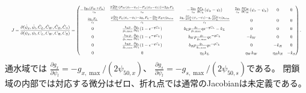 \documentclass[a4paper,11pt]{ltjsarticle}
\begin{document}
\begin{landscape}
\begin{equation}\label{eq:fulljacobian}
\resizebox{\linewidth}{!}{$\displaystyle
J=\frac{\partial(\dot\psi_x,\dot\psi_l,\dot C_L,\dot C_W,\dot C_R,\dot C_S)}
        {\partial(\psi_x,\psi_l,C_L,C_W,C_R,C_S)}
=\begin{pmatrix}
-\frac{2g_x(F_W+F_L)}{c_x}
&\frac{2\frac{\partial g_x}{\partial\psi_l}
 \{F_W(\psi_r-\psi_x)-F_L(\psi_x-\psi_l)\}+2g_xF_L}{c_x}
&-\frac{2g_x}{c_x}\frac{\partial F_L}{\partial C_L}(\psi_x-\psi_l)
&\frac{2g_x}{c_x}\frac{\partial F_W}{\partial C_W}(\psi_r-\psi_x)&0&0\\[6pt]
\frac{2g_xF_L}{c_l}
&\frac{2\frac{\partial g_x}{\partial\psi_l}F_L(\psi_x-\psi_l)-2g_xF_L
 -\frac{\partial g_s}{\partial\psi_l}F_Ev/p_{\mathrm{atm}}}{c_l}
&\frac{2g_x\frac{\partial F_L}{\partial C_L}(\psi_x-\psi_l)
 -g_s\frac{\partial F_E}{\partial C_L}v/p_{\mathrm{atm}}}{c_l}&0&0&0\\[6pt]
0&\frac{b_Lp}{g_{s,\max}}\frac{\partial g_s}{\partial\psi_l}(1-e^{-qC_L})
&b_Lp\frac{g_s}{g_{s,\max}}qe^{-qC_L}-k_L&0&0&0\\[6pt]
0&\frac{b_Wp}{g_{s,\max}}\frac{\partial g_s}{\partial\psi_l}(1-e^{-qC_L})
&b_Wp\frac{g_s}{g_{s,\max}}qe^{-qC_L}&-k_W&0&0\\[6pt]
0&\frac{b_Rp}{g_{s,\max}}\frac{\partial g_s}{\partial\psi_l}(1-e^{-qC_L})
&b_Rp\frac{g_s}{g_{s,\max}}qe^{-qC_L}&0&-k_R&0\\[6pt]
0&0&\eta_Lk_L&\eta_Wk_W&\eta_Rk_R&-k_S
\end{pmatrix}.$}
\end{equation}
\noindent
通水域では
$\frac{\partial g_x}{\partial\psi_l}=-g_{x,\max}/(2\psi_{50,x})$、
$\frac{\partial g_s}{\partial\psi_l}=-g_{s,\max}/(2\psi_{50,s})$である。
閉鎖域の内部では対応する微分はゼロ、折れ点では通常のJacobianは未定義である。


\end{landscape}
\end{document}
